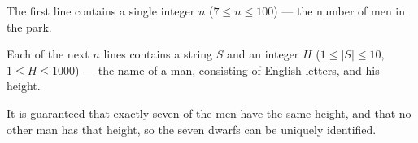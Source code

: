 The first line contains a single integer $n$ ($7 \le n \le 100$) --- the number of men in the park.

Each of the next $n$ lines contains a string $S$ and an integer $H$ ($1 \le |S| \le 10$, $1 \le H \le 1000$) --- the name of a man, consisting of English letters, and his height.

It is guaranteed that exactly seven of the men have the same height, and that no other man has that height, so the seven dwarfs can be uniquely identified.
